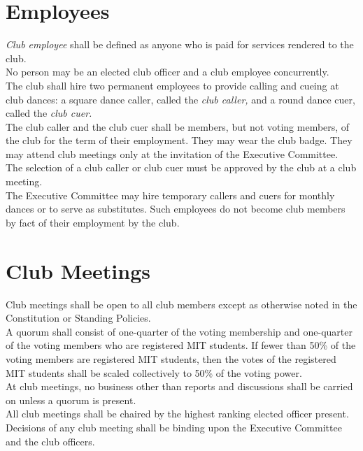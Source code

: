\documentclass{article}
\begin{document}
\section {Employees}
{\it Club employee\/} shall be defined as anyone who is paid for services rendered to the club.\\
No person may be an elected club officer and a club employee concurrently.\\
The club shall hire two permanent employees to provide calling and cueing at club dances: a square dance caller, called the {\it club caller,\/} and a round dance cuer, called the {\it club cuer.\/}\\
The club caller and the club cuer shall be members, but not voting members, of the club for the term of their employment.  They may wear the club badge.  They may attend club meetings only at the invitation of the Executive Committee.\\
The selection of a club caller or club cuer must be approved by the club at a club meeting.\\
The Executive Committee may hire temporary callers and cuers for monthly dances or to serve as substitutes.  Such employees do not become club members by fact of their employment by the club. 
\section {Club Meetings}
Club meetings shall be open to all club members except as otherwise
noted in the Constitution or Standing Policies.\\
A quorum shall consist of one-quarter of the voting membership and one-quarter of the voting members who are registered MIT students. If fewer than 50\% of the voting members are registered MIT students, then the votes of the registered MIT students shall be scaled collectively to 50\% of the voting power. \\
At club meetings, no business other than reports and discussions shall
be carried on unless a quorum is present.\\
All club meetings shall be chaired by the highest ranking elected officer present.\\
Decisions of any club meeting shall be binding upon the Executive Committee
and the club officers.
\end{document}
